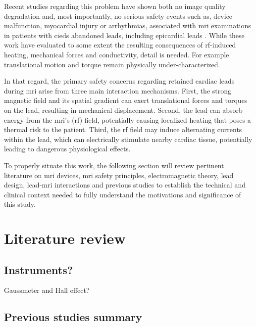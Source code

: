 Recent studies regarding this problem have shown both no image quality degradation and, most importantly, no serious safety events such as, device malfunction, myocardial injury or arrhythmias, associated with \gls{mri} examinations in patients with \gls{cied}s abandoned leads, including epicardial leads \cite{vuorinen2021,meier2024}. While these work have evaluated to some extent the resulting consequences of \gls{rf}-induced heating, mechanical forces and conductivity, detail is needed. For example translational motion and torque remain physically under-characterized.


In that regard, the primary safety concerns regarding retained cardiac leads during \gls{mri} arise from three main interaction mechanisms. First, the strong magnetic field and its spatial gradient can exert translational forces and torques on the lead, resulting in mechanical displacement. Second, the lead can absorb energy from the \gls{mri}’s (\gls{rf}) field, potentially causing localized heating that poses a thermal risk to the patient. Third, the \gls{rf} field may induce alternating currents within the lead, which can electrically stimulate nearby cardiac tissue, potentially leading to dangerous physiological effects.
 
 To properly situate this work, the following section will review pertinent literature on \gls{mri} devices, \gls{mri} safety principles, electromagnetic theory, lead design, lead-\gls{mri} interactions and previous studies to establish the technical and clinical context needed to fully understand the motivations and significance of this study.

\section{Literature review}





\subsection{Instruments?}

Gaussmeter and Hall effect?

\subsection{Previous studies summary}

